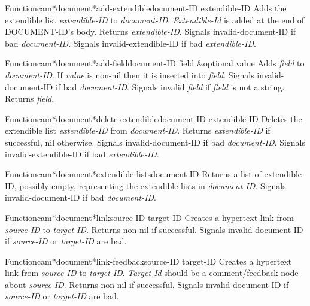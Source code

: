 \begin{functiondoc}{Function}{cam*document*add-extendible}{document-ID extendible-ID}
Adds the extendible list {\em extendible-ID} to {\em document-ID}.  {\em Extendible-Id}
is added at the end of DOCUMENT-ID's body.
Returns {\em extendible-ID}.
Signals invalid-document-ID if bad {\em document-ID}.
Signals invalid-extendible-ID if bad {\em extendible-ID}.
\end{functiondoc}

\begin{functiondoc}{Function}{cam*document*add-field}{document-ID field \&optional value}
Adds {\em field} to {\em document-ID}.  If {\em value} is non-nil then it is inserted into
{\em field}.
Signals invalid-document-ID if bad {\em document-ID}.
Signals invalid {\em field} if {\em field} is not a string.
Returns {\em field}.
\end{functiondoc}

\begin{functiondoc}{Function}{cam*document*delete-extendible}{document-ID extendible-ID}
Deletes the extendible list {\em extendible-ID} from {\em document-ID}.
Returns {\em extendible-ID} if successful, nil otherwise.
Signals invalid-document-ID if bad {\em document-ID}.
Signals invalid-extendible-ID if bad {\em extendible-ID}.
\end{functiondoc}

\begin{functiondoc}{Function}{cam*document*extendible-lists}{document-ID}
Returns a list of extendible-ID, possibly empty, representing the extendible 
lists in {\em document-ID}.
Signals invalid-document-ID if bad {\em document-ID}.
\end{functiondoc}

\begin{functiondoc}{Function}{cam*document*link}{source-ID target-ID}
Creates a hypertext link from {\em source-ID} to {\em target-ID}.
Returns non-nil if successful.
Signals invalid-document-ID if {\em source-ID} or {\em target-ID} are bad.
\end{functiondoc}

\begin{functiondoc}{Function}{cam*document*link-feedback}{source-ID target-ID}
Creates a hypertext link from {\em source-ID} to {\em target-ID}.
{\em Target-Id} should be a comment/feedback node about {\em source-ID}.
Returns non-nil if successful.
Signals invalid-document-ID if {\em source-ID} or {\em target-ID} are bad.
\end{functiondoc}

